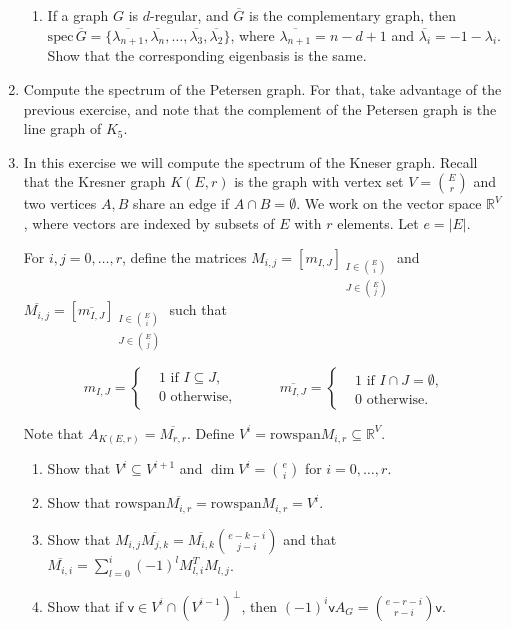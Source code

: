 \documentclass[kulak]{tplt}
\theoremstyle{definition}
\newcommand{\R}{\mathbb{R}}
\newcommand{\vv}{\mathsf{v}}
\newcommand{\rowspn}{\mathrm{rowspan}}
\newcommand{\spec}{\mathrm{spec}}
\begin{document}
\begin{enumerate}
\begin{enumerate}
\item If a graph $G$ is $d$-regular, and $\overline{G}$ is the complementary graph, then $\spec \, \overline{G} = \{ \overline{\lambda_{n+1}}, \overline{\lambda_{n}}, \ldots, \overline{\lambda_{3}}, \overline{\lambda_{2}} \}$, where $\overline{\lambda_{n+1}} = n - d + 1$ and $\overline{\lambda_i} = - 1 - \lambda _ i$.
Show that the corresponding eigenbasis is the same.
\end{enumerate}


\item Compute the spectrum of the Petersen graph.
For that, take advantage of the previous exercise, and note that the complement of the Petersen graph is the line graph of $K_5$.

\item In this exercise we will compute the spectrum of the Kneser graph.
Recall that the Kresner graph $K(E, r)$ is the graph with vertex set $V = \binom{E}{r}$ and two vertices $A, B$ share an edge if $A \cap B = \emptyset$.
We work on the vector space $\R^V$, where vectors are indexed by subsets of $E$ with $r$ elements.
Let $e = |E|$.

For $i, j = 0, \ldots, r$, define the matrices $M_{i, j} = [m_{I, J}]_{\substack{I\in \binom{E}{i} \\ J \in \binom{E}{j}}}$ and $\overline{M_{i, j}} = [\overline{m_{I, J}}]_{\substack{I\in \binom{E}{i} \\ J \in \binom{E}{j}}}$ such that 

$$ m_{I, J} =\begin{cases*}
      & 1 \text{ if $I \subseteq J$,}\\
      & 0 \text{ otherwise,}
    \end{cases*}  \quad \quad \quad 
     \overline{m_{I, J}} =\begin{cases*}
      & 1 \text{ if $I \cap J = \emptyset $,}\\
      & 0 \text{ otherwise.}
    \end{cases*}  $$

Note that $A_{K(E, r)} = \overline{M_{r, r}}$.
Define $V^i = \rowspn M_{i, r} \subseteq \R^V$.

\begin{enumerate}
\item Show that $V^i \subseteq V^{i+1}$ and $\dim V^i = \binom{e}{i}$ for $i=0, \ldots, r$.

\item Show that $\rowspn \overline{M_{i, r}} = \rowspn M_{i, r} = V^i$.

\item Show that $M_{i, j} \overline{M_{j, k}} = \overline{M_{i, k}} \binom{e - k - i}{j-i}$ and that $\overline{M_{i, i}} = \sum_{l=0}^i (-1)^l M_{l, i}^TM_{l, j}$.

\item Show that if $\vv \in V^i \cap (V^{i-1})^{\perp}$, then $(-1)^i \vv A_G = \binom{e-r-i}{r-i} \vv $.

\end{enumerate}


\end{enumerate}
\end{document}

